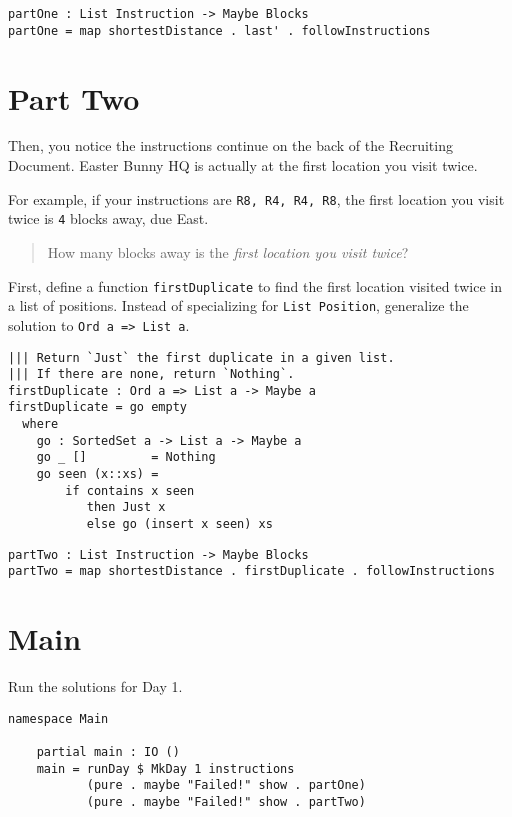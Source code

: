 \documentclass[b5paper,twoside]{amsbook}
\begin{document}
\begin{verbatim}
partOne : List Instruction -> Maybe Blocks
partOne = map shortestDistance . last' . followInstructions
\end{verbatim}

\section{Part Two}\label{part-two}

Then, you notice the instructions continue on the back of the Recruiting
Document. Easter Bunny HQ is actually at the first location you visit
twice.

For example, if your instructions are
\texttt{R8, R4, R4, R8}, the first location you visit twice
is \texttt{4} blocks away, due East.

\begin{quote}
  How many blocks away is the \textit{first location you visit twice}?
\end{quote}

First, define a function \texttt{firstDuplicate} to find
the first location visited twice in a list of positions. Instead of
specializing for \texttt{List Position}, generalize the
solution to \texttt{Ord a => List a}.

\begin{verbatim}
||| Return `Just` the first duplicate in a given list.
||| If there are none, return `Nothing`.
firstDuplicate : Ord a => List a -> Maybe a
firstDuplicate = go empty
  where
    go : SortedSet a -> List a -> Maybe a
    go _ []         = Nothing
    go seen (x::xs) =
        if contains x seen
           then Just x
           else go (insert x seen) xs
\end{verbatim}

\begin{verbatim}
partTwo : List Instruction -> Maybe Blocks
partTwo = map shortestDistance . firstDuplicate . followInstructions
\end{verbatim}

\newpage

\section{Main}\label{main}

Run the solutions for Day 1.

\begin{verbatim}
namespace Main

    partial main : IO ()
    main = runDay $ MkDay 1 instructions
           (pure . maybe "Failed!" show . partOne)
           (pure . maybe "Failed!" show . partTwo)
\end{verbatim}
\end{document}
